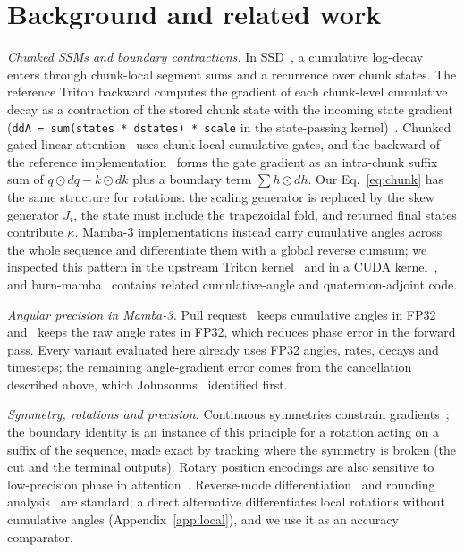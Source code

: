 \section{Background and related work}\label{sec:related}
\emph{Chunked SSMs and boundary contractions.} In SSD~\cite{ssd}, a cumulative log-decay enters through chunk-local segment sums and a recurrence over chunk states. The reference Triton backward computes the gradient of each chunk-level cumulative decay as a contraction of the stored chunk state with the incoming state gradient (\texttt{ddA = sum(states * dstates) * scale} in the state-passing kernel)~\cite{mambacode}. Chunked gated linear attention~\cite{gla} uses chunk-local cumulative gates, and the backward of the reference implementation~\cite{fla} forms the gate gradient as an intra-chunk suffix sum of $q\odot dq-k\odot dk$ plus a boundary term $\sum h\odot dh$. Our Eq.~\eqref{eq:chunk} has the same structure for rotations: the scaling generator is replaced by the skew generator $J_i$, the state must include the trapezoidal fold, and returned final states contribute $\kappa$. Mamba-3 implementations instead carry cumulative angles across the whole sequence and differentiate them with a global reverse cumsum; we inspected this pattern in the upstream Triton kernel~\cite{mambacode} and in a CUDA kernel~\cite{hf}, and burn-mamba~\cite{burn} contains related cumulative-angle and quaternion-adjoint code.

\emph{Angular precision in Mamba-3.} Pull request~\cite{pr1059} keeps cumulative angles in FP32 and~\cite{pr1070} keeps the raw angle rates in FP32, which reduces phase error in the forward pass. Every variant evaluated here already uses FP32 angles, rates, decays and timesteps; the remaining angle-gradient error comes from the cancellation described above, which Johnsonms~\cite{johnsonms} identified first.

\emph{Symmetry, rotations and precision.} Continuous symmetries constrain gradients~\cite{kunin}; the boundary identity is an instance of this principle for a rotation acting on a suffix of the sequence, made exact by tracking where the symmetry is broken (the cut and the terminal outputs). Rotary position encodings are also sensitive to low-precision phase in attention~\cite{ropebf16}. Reverse-mode differentiation~\cite{ad} and rounding analysis~\cite{higham} are standard; a direct alternative differentiates local rotations without cumulative angles (Appendix~\ref{app:local}), and we use it as an accuracy comparator.

